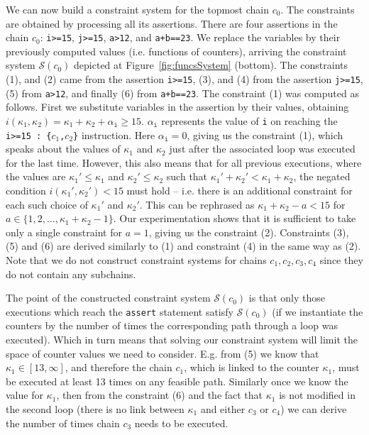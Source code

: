 \documentclass{llncs}
\newcommand{\cS}{\mathcal{S}}
\begin{document}
We can now build a constraint system for the topmost chain
$c_0$. The constraints are obtained by processing all its assertions. There  are
four assertions in the chain $c_0$: \texttt{i>=15}, \texttt{j>=15},
\texttt{a>12}, and \texttt{a+b==23}. We replace the variables by their
previously computed values (i.e. functions of counters), arriving the constraint
system  $\mathcal{S}(c_0)$ depicted at Figure~\ref{fig:funcsSystem}
(bottom).
The constraints (1), and (2) came from the assertion \texttt{i>=15}, (3),
and (4) from the assertion \texttt{j>=15}, (5) from \texttt{a>12}, and
finally (6) from \texttt{a+b==23}. The constraint (1) was computed as
follows. First we substitute variables in the assertion by their values,
obtaining $i(\kappa_1, \kappa_2) = \kappa_1 + \kappa_2 + \alpha_\mathtt{i}
\geq 15$. $\alpha_\mathtt{i}$ represents the value of \texttt{i} on reaching
the \texttt{i>=15 : \{$c_1$,$c_2$\}} instruction. Here $\alpha_\mathtt{i} = 0$,
giving us the constraint (1), which speaks about the values of $\kappa_1$
and $\kappa_2$ just after the associated loop was executed for the last
time. However, this also means that for all previous executions, where the
values are $\kappa_1'\leq\kappa_1$ and $\kappa_2'\leq\kappa_2$ such that
$\kappa_1'+\kappa_2'<\kappa_1+\kappa_2$, the negated condition $i(\kappa_1',
\kappa_2') < 15$ must hold -- i.e. there is an additional constraint for
each such choice of $\kappa_1'$ and $\kappa_2'$. This can be rephrased as
$\kappa_1+ \kappa_2 - a < 15$ for $a\in\{1,2,\ldots,\kappa_1+\kappa_2-1\}$.
Our experimentation shows that it is sufficient to take only a single 
constraint for $a=1$, giving us the constraint (2). Constraints (3), (5) and
(6) are derived similarly to (1) and constraint (4) in the same way as
(2). Note that we do not construct constraint systems for chains
$c_1, c_2, c_3, c_4$ since they do not contain any subchains.

The point of the constructed constraint system $\cS(c_0)$ is that
only those executions which reach the \texttt{assert} statement satisfy
$\cS(c_0)$ (if we instantiate the counters by the number of times
the corresponding path through a loop was executed). Which in turn means
that solving our constraint system will limit the space of counter values we
need to consider. E.g. from (5) we know that $\kappa_1\in[13,\infty]$,
and therefore the chain $c_1$, which is linked to the counter $\kappa_1$, must be executed at least
13 times on any feasible path. Similarly once we know the value for
$\kappa_1$, then  from the constraint (6) and the
fact that $\kappa_1$ is not modified in the second loop (there is no link
between $\kappa_1$ and either $c_3$ or $c_4$) we
can derive the number of times chain $c_3$ needs to be executed.
\end{document}
